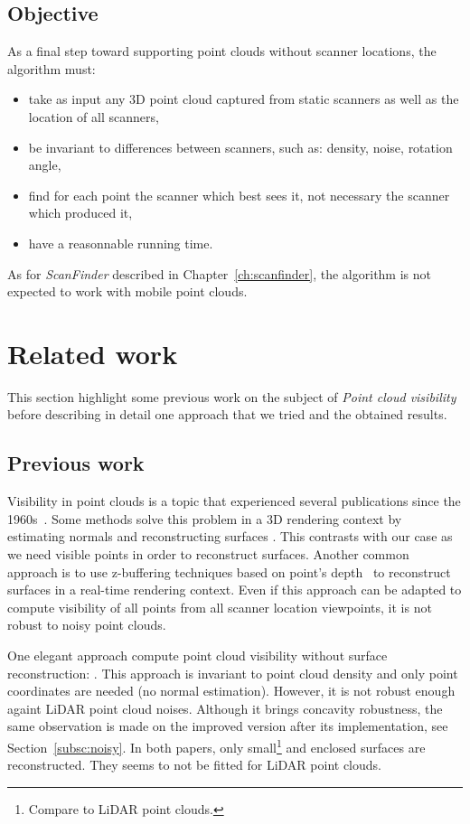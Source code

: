 \subsection{Objective}
\label{subsc:vis-objective}
As a final step toward supporting point clouds without scanner locations, the algorithm must:
\begin{itemize}
\item take as input any 3D point cloud captured from static scanners as well as the location of all scanners,
\item be invariant to differences between scanners, such as: density, noise, rotation angle,
\item find for each point the scanner which best sees it, not necessary the scanner which produced it,
\item have a reasonnable running time.
\end{itemize}

As for \emph{ScanFinder} described in Chapter~\ref{ch:scanfinder}, the algorithm is not expected to work with mobile point clouds.


\section{Related work}
\label{sc:related-visibility}
This section highlight some previous work on the subject of \emph{Point cloud visibility} before describing in detail one approach that we tried and the obtained results.

\subsection{Previous work}
Visibility in point clouds is a topic that experienced several publications since the 1960s~\cite{appel, sutherland, funkhouser, greene, bittner}. Some methods solve this problem in a 3D rendering context by estimating normals and reconstructing surfaces \cite{sainz1, sainz2, wald, wu}. This contrasts with our case as we need visible points in order to reconstruct surfaces. Another common approach is to use z-buffering techniques based on point's depth~\cite{dachsbacher} to reconstruct
surfaces in a real-time rendering context. Even if this approach can be adapted to compute visibility of all points from all scanner location viewpoints, it is not robust to noisy point clouds.

One elegant approach compute point cloud visibility without surface reconstruction: \cite{vis1}. This approach is invariant to point cloud density and only point coordinates are needed (no normal estimation). However, it is not robust enough againt LiDAR point cloud noises. Although it brings concavity robustness, the same observation is made on the improved version \cite{vis2} after its implementation, see Section~\ref{subsc:noisy}. In both papers, only small\footnote{Compare to LiDAR point clouds.} and enclosed surfaces are reconstructed. They seems to not be fitted for LiDAR point clouds.

